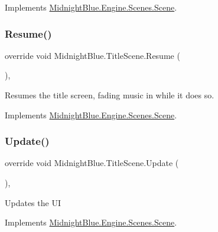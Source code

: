 Implements \hyperlink{class_midnight_blue_1_1_engine_1_1_scenes_1_1_scene_aeb3c4d9bea0177d21fbffcdabab660de}{Midnight\+Blue.\+Engine.\+Scenes.\+Scene}.

\hypertarget{class_midnight_blue_1_1_title_scene_afb0bb3ad8b2766b5d57537dc1ef22249}{}\label{class_midnight_blue_1_1_title_scene_afb0bb3ad8b2766b5d57537dc1ef22249} 
\subsubsection{\texorpdfstring{Resume()}{Resume()}}
{\footnotesize\ttfamily override void Midnight\+Blue.\+Title\+Scene.\+Resume (\begin{DoxyParamCaption}{ }\end{DoxyParamCaption})\hspace{0.3cm}{\ttfamily [inline]}, {\ttfamily [virtual]}}



Resumes the title screen, fading music in while it does so. 



Implements \hyperlink{class_midnight_blue_1_1_engine_1_1_scenes_1_1_scene_ab7cd837b20785116007a4732d90bc548}{Midnight\+Blue.\+Engine.\+Scenes.\+Scene}.

\hypertarget{class_midnight_blue_1_1_title_scene_a4052b2a261434462cd0150e2f4da3c5b}{}\label{class_midnight_blue_1_1_title_scene_a4052b2a261434462cd0150e2f4da3c5b} 
\subsubsection{\texorpdfstring{Update()}{Update()}}
{\footnotesize\ttfamily override void Midnight\+Blue.\+Title\+Scene.\+Update (\begin{DoxyParamCaption}{ }\end{DoxyParamCaption})\hspace{0.3cm}{\ttfamily [inline]}, {\ttfamily [virtual]}}



Updates the UI 



Implements \hyperlink{class_midnight_blue_1_1_engine_1_1_scenes_1_1_scene_a4e37ff3d5362a8ad5c0d82d7c990dfdf}{Midnight\+Blue.\+Engine.\+Scenes.\+Scene}.

